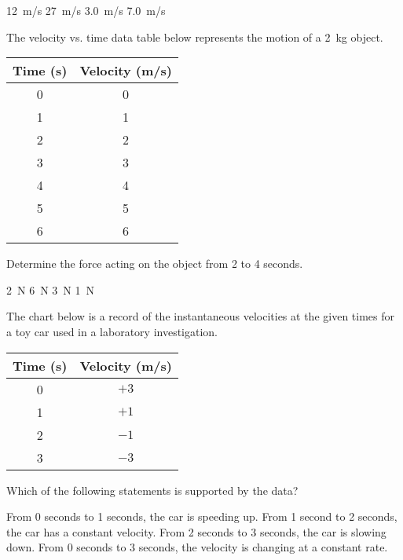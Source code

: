 \documentclass[]{exam}
\begin{document}
\begin{questions}
\begin{randomizechoices}
    \choice \SI{12}{m/s}
    \correctchoice \SI{27}{m/s}
    \choice \SI{3.0}{m/s}
    \choice \SI{7.0}{m/s}
\end{randomizechoices}

\question
The velocity vs. time data table below represents the motion of a \SI{2}{kg} object.

\begin{center}
    \begin{tabular}{|c|c|}
        \hline
         \textbf{Time} (s) & \textbf{Velocity} (m/s) \\ \hline
         0 & 0 \\ \hline
         1 & 1 \\ \hline
         2 & 2 \\ \hline
         3 & 3 \\ \hline
         4 & 4 \\ \hline
         5 & 5 \\ \hline
         6 & 6 \\ \hline
    \end{tabular}
\end{center}

Determine the force acting on the object from 2 to 4 seconds.

\begin{randomizechoices}
    \correctchoice \SI{2}{N}
    \choice \SI{6}{N}
    \choice \SI{3}{N}
    \choice \SI{1}{N}
\end{randomizechoices}

\question
The chart below is a record of the instantaneous velocities at the given times for a toy car used in a laboratory investigation.

\begin{center}
    \begin{tabular}{|c|c|}
        \hline
         \textbf{Time} (s) & \textbf{Velocity} (m/s) \\ \hline
         0 & $+3$ \\ \hline
         1 & $+1$ \\ \hline
         2 & $-1$ \\ \hline
         3 & $-3$ \\ \hline
    \end{tabular}
\end{center}

Which of the following statements is supported by the data?

\begin{randomizechoices}
    \choice From 0 seconds to 1 seconds, the car is speeding up.
    \choice From 1 second to 2 seconds, the car has a constant velocity.
    \choice From 2 seconds to 3 seconds, the car is slowing down.
    \correctchoice From 0 seconds to 3 seconds, the velocity is changing at a constant rate.
\end{randomizechoices}


\end{questions}
\end{document}
